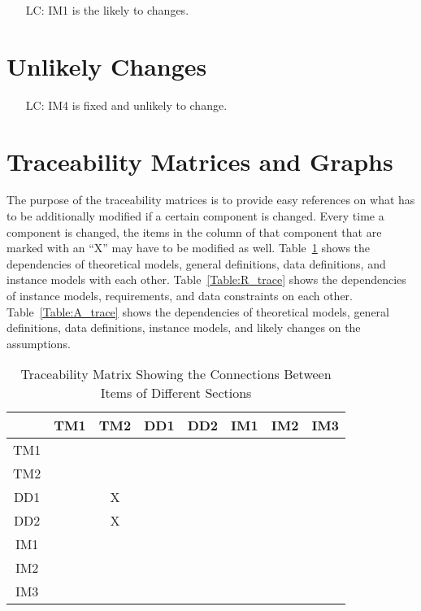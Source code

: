 \documentclass[12pt]{article}
\newcounter{lcnum} %
\begin{document}
\noindent \begin{itemize}

\item[LC\refstepcounter{lcnum}\thelcnum\label{LC_meaningfulLabel}:] IM1 is the likely to changes.

\end{itemize}

\section{Unlikely Changes}    

\noindent \begin{itemize}

\item[LC\refstepcounter{lcnum}\thelcnum\label{LC_meaningfulLabel}:] IM4 is fixed and unlikely to change.

\end{itemize}

\section{Traceability Matrices and Graphs}

The purpose of the traceability matrices is to provide easy references on what has to be additionally modified if a certain component is changed.  Every time a component is changed, the items in the column of that component that are marked with an ``X'' may have to be modified as well.  Table~\ref{Table:trace} shows the dependencies of theoretical models, general definitions, data definitions, and instance models with each other. Table~\ref{Table:R_trace} shows the dependencies of instance models, requirements, and data constraints on each other. Table~\ref{Table:A_trace} shows the dependencies of theoretical models, general definitions, data definitions, instance models, and likely changes on the assumptions.

\begin{table}[htbp]
\centering
\begin{tabular}{|c|c|c|c|c|c|c|c|}
\hline        
    & TM1 & TM2 & DD1 & DD2 & IM1 & IM2 & IM3 \\
\hline
TM1 & & & & & & & \\ \hline
TM2 & & & & & & & \\ \hline
DD1 & & X & & & & & \\ \hline
DD2 & & X & & & & & \\ \hline
IM1 & & & & & & & \\ \hline
IM2 & & & & & & & \\ \hline
IM3 & & & & & & & \\ \hline
\hline
\end{tabular}
\caption{Traceability Matrix Showing the Connections Between Items of Different Sections}
\label{Table:trace}
\end{table}
\end{document}
